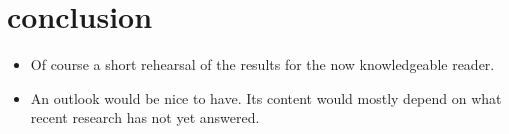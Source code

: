 \section{conclusion}
\label{sec:conclusion}

\begin{itemize}
	\item
	Of course a short rehearsal of the results for the now knowledgeable reader.

	\item
	An outlook would be nice to have.
	Its content would mostly depend on what recent research has not yet answered.
\end{itemize}

\lipsum[1-5]